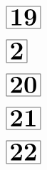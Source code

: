\documentclass[a4paper, 10pt]{article}
\begin{document}
\thispagestyle{empty}
\begin{minipage}[t]{0.17\textwidth}
                \vspace*{-1.59cm}
        \hspace*{2.4cm}
        $\boxed{\textbf{\Huge19}}$
\end{minipage}
\begin{minipage}[t]{0.83\textwidth}
        
\end{minipage}

\thispagestyle{empty}
\begin{minipage}[t]{0.17\textwidth}
                \vspace*{-1.59cm}
        \hspace*{2.4cm}
        $\boxed{\textbf{\Huge2}}$
\end{minipage}
\begin{minipage}[t]{0.83\textwidth}
        
\end{minipage}

\thispagestyle{empty}
\begin{minipage}[t]{0.17\textwidth}
                \vspace*{-1.59cm}
        \hspace*{2.4cm}
        $\boxed{\textbf{\Huge20}}$
\end{minipage}
\begin{minipage}[t]{0.83\textwidth}
        
\end{minipage}

\thispagestyle{empty}
\begin{minipage}[t]{0.17\textwidth}
                \vspace*{-1.59cm}
        \hspace*{2.4cm}
        $\boxed{\textbf{\Huge21}}$
\end{minipage}
\begin{minipage}[t]{0.83\textwidth}
        
\end{minipage}

\thispagestyle{empty}
\thispagestyle{empty}
\begin{minipage}[t]{0.17\textwidth}
                \vspace*{-1.59cm}
        \hspace*{2.4cm}
        $\boxed{\textbf{\Huge22}}$
\end{minipage}
\begin{minipage}[t]{0.83\textwidth}
        
\end{minipage}
\end{document}
